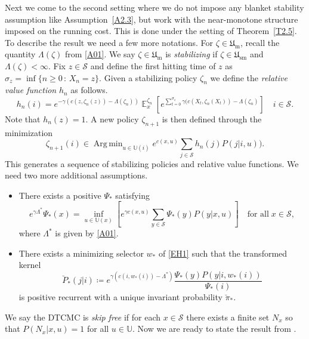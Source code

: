 \documentclass[notitlepage,11pt,reqno]{amsart}
\numberwithin{equation}{section}
\theoremstyle{plain}
\theoremstyle{definition}
\theoremstyle{remark}
\newcommand{\Act}{{\mathds{U}}}
\newcommand{\cS}{{\mathcal{S}}}     %
\newcommand{\Um}{\mathfrak{U}_{\mathrm{m}}}
\newcommand{\Usm}{\mathfrak{U}_{\mathrm{sm}}}
\DeclareMathOperator{\Exp}{\mathbb{E}} %
\DeclareMathOperator*{\Argmin}{Arg\,min}
\newcommand{\df}{\coloneqq}
\begin{document}
Next we come to the second setting where we do not impose any blanket stability assumption  like Assumption~\ref{A2.3}, but work with the near-monotone structure imposed on the running cost. This is 
done under the setting of Theorem~\ref{T2.5}. To describe the result we need a few more notations. For $\zeta\in\Um$, recall the 
quantity $\Lambda(\zeta)$ from \eqref{A01}. We say $\zeta\in\Um$ is {\it stabilizing} if $\zeta\in\Usm$ and $\Lambda(\zeta)<\infty$.
Fix $z\in\cS$ and define the first hitting time of $z$ as $\sigma_z=\inf\{n\geq 0\, :\, X_n=z\}$. Given a stabilizing policy $\zeta_n$ we define the
{\it relative value function} $h_n$ as follows.
$$h_n(i)=e^{-\gamma(c(z, \zeta_n(z))-\Lambda(\zeta_n))}\Exp_x^{\zeta_n}\left[e^{\sum_{t=0}^{\sigma_z} \gamma(c(X_t, \zeta_n(X_t))-\Lambda(\zeta_n)}\right]\quad i\in\cS.$$
Note that $h_n(z)=1$. A new policy $\zeta_{n+1}$ is then defined through the minimization
$$\zeta_{n+1}(i)\in \Argmin_{u\in\Act(i)} e^{c(x, u)}\sum_{j\in\cS} h_n(j)P(j|i, u)).$$
This generates a sequence of stabilizing policies and relative value functions. We need two more additional assumptions.
\begin{itemize}
\item[\hypertarget{H1}(H1)] There exists a positive $\Psi_*$ satisfying
\begin{equation}\label{EH1}
e^{\gamma\Lambda^*}\Psi_*(x)= \inf_{u\in\Act(x)} \left[e^{\gamma c(x, u)} \sum_{y\in\cS} \Psi_*(y) P(y|x, u)\right]\quad \text{for all}\; x\in \cS,
\end{equation}
where $\Lambda^*$ is given by \eqref{A01}.
\item[\hypertarget{H2}{(H2)}] There exists a minimizing selector $w_*$ of \eqref{EH1} such that the transformed kernel
\begin{equation}\label{EH2}
\breve{P}_*(j|i)\df e^{\gamma(c(i, w_*(i))-\Lambda^*)} \frac{\Psi_*(y)P(y|i, w_*(i))}{\Psi_*(i)}
\end{equation}
is positive recurrent with a unique invariant probability $\breve\pi_*$.
\end{itemize}
We say the DTCMC is {\it skip free} if for each $x\in\cS$ there exists a finite set $N_x$ so that $P(N_x|x, u)=1$ for all $u\in\Act$. Now we are ready to state the result from \cite[Theorem~5.4]{MR1886226}.
\end{document}
